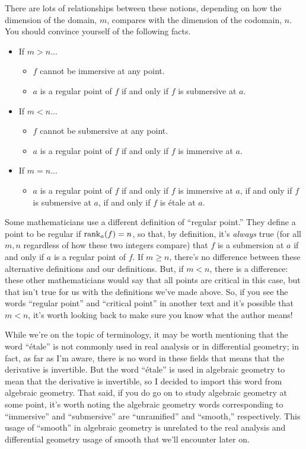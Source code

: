 There are lots of relationships between these notions, depending on how the dimension of the domain, $m$, compares with the dimension of the codomain, $n$. You should convince yourself of the following facts.  
\begin{itemize}
	\item If $m > n$...
	\begin{itemize}
		\item $f$ cannot be immersive at any point.
		\item $a$ is a regular point of $f$ if and only if $f$ is submersive at $a$.
	\end{itemize}
	\item If $m < n$...
	\begin{itemize}
		\item $f$ cannot be submersive at any point.
		\item $a$ is a regular point of $f$ if and only if $f$ is immersive at $a$.
	\end{itemize}
	\item If $m = n$...
	\begin{itemize}
		\item $a$ is a regular point of $f$ if and only if $f$ is immersive at $a$, if and only if $f$ is submersive at $a$, if and only if $f$ is \'etale at $a$. 
	\end{itemize}
\end{itemize}

\begin{caution}
	Some mathematicians use a different definition of ``regular point.'' They define a point to be regular if $\operatorname{rank}_a(f) = n$, so that, by definition, it's \emph{always} true (for all $m, n$ regardless of how these two integers compare) that $f$ is a submersion at $a$ if and only if $a$ is a regular point of $f$. If $m \geq n$, there's no difference between these alternative definitions and our definitions. But, if $m < n$, there is a difference: these other mathematicians would say that all points are critical in this case, but that isn't true for us with the definitions we've made above. So, if you see the words ``regular point'' and ``critical point'' in another text and it's possible that $m < n$, it's worth looking back to make sure you know what the author means!
\end{caution}

\begin{unimportantremark}
	While we're on the topic of terminology, it may be worth mentioning that the word ``\'etale'' is not commonly used in real analysis or in differential geometry; in fact, as far as I'm aware, there is no word in these fields that means that the derivative is invertible. But the word ``\'etale'' is used in algebraic geometry to mean that the derivative is invertible, so I decided to import this word from algebraic geometry. That said, if you do go on to study algebraic geometry at some point, it's worth noting the algebraic geometry words corresponding to ``immersive'' and ``submersive'' are ``unramified'' and ``smooth,'' respectively. This usage of ``smooth'' in algebraic geometry is unrelated to the real analysis and differential geometry usage of smooth that we'll encounter later on. 
\end{unimportantremark}


